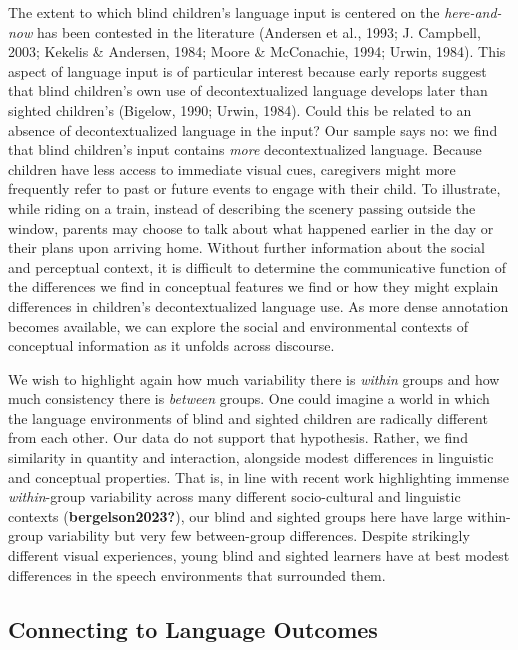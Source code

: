 \documentclass[
  man]{apa6}
\begin{document}
The extent to which blind children's language input is centered on the \emph{here-and-now} has been contested in the literature (Andersen et al., 1993; J. Campbell, 2003; Kekelis \& Andersen, 1984; Moore \& McConachie, 1994; Urwin, 1984). This aspect of language input is of particular interest because early reports suggest that blind children's own use of decontextualized language develops later than sighted children's (Bigelow, 1990; Urwin, 1984). Could this be related to an absence of decontextualized language in the input? Our sample says no: we find that blind children's input contains \emph{more} decontextualized language. Because children have less access to immediate visual cues, caregivers might more frequently refer to past or future events to engage with their child. To illustrate, while riding on a train, instead of describing the scenery passing outside the window, parents may choose to talk about what happened earlier in the day or their plans upon arriving home. Without further information about the social and perceptual context, it is difficult to determine the communicative function of the differences we find in conceptual features we find or how they might explain differences in children's decontextualized language use. As more dense annotation becomes available, we can explore the social and environmental contexts of conceptual information as it unfolds across discourse.

We wish to highlight again how much variability there is \emph{within} groups and how much consistency there is \emph{between} groups. One could imagine a world in which the language environments of blind and sighted children are radically different from each other. Our data do not support that hypothesis. Rather, we find similarity in quantity and interaction, alongside modest differences in linguistic and conceptual properties. That is, in line with recent work highlighting immense \emph{within}-group variability across many different socio-cultural and linguistic contexts (\textbf{bergelson2023?}), our blind and sighted groups here have large within-group variability but very few between-group differences. Despite strikingly different visual experiences, young blind and sighted learners have at best modest differences in the speech environments that surrounded them.

\hypertarget{connecting-to-language-outcomes}{%
\subsection{Connecting to Language Outcomes}\label{connecting-to-language-outcomes}}
\end{document}
